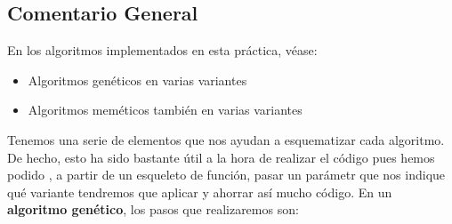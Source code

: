 \documentclass[11pt]{article}
\begin{document}
\subsection{Comentario General}
En los algoritmos implementados en esta práctica, véase:
\begin{itemize}
	\item Algoritmos genéticos en varias variantes
	\item Algoritmos meméticos también en varias variantes
\end{itemize}
Tenemos una serie de elementos que nos ayudan a esquematizar cada algoritmo. De hecho, esto ha sido bastante útil a la hora de realizar el código pues hemos podido , a partir de un esqueleto de función, pasar un parámetr que nos indique qué variante tendremos que aplicar y ahorrar así mucho código. En un \textbf{algoritmo genético}, los pasos que realizaremos son:
\end{document}
